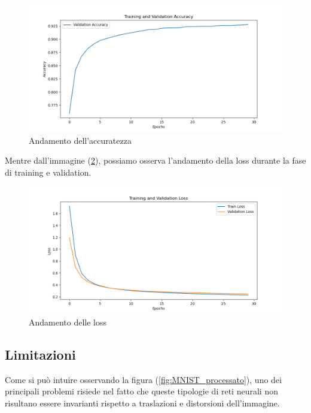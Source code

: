 \begin{figure}[H]
    \centering
    \includegraphics[width=1.0\textwidth]{Immagini/Grafici/training_validation_accuracy_v1.png}
    \caption{Andamento dell'accuratezza}
    \label{fig:DNN_accuracy_dopo}
\end{figure}

Mentre dall'immagine (\ref{fig:DNN_loss}), possiamo osserva l'andamento della loss 
durante la fase di training e validation. 

\begin{figure}[H]
    \centering
    \includegraphics[width=1.0\textwidth]{Immagini/Grafici/training_validation_loss_v1.png}
    \caption{Andamento delle loss}
    \label{fig:DNN_loss}
\end{figure}

\newpage
\subsection{Limitazioni}

Come si può intuire osservando la figura (\ref{fig:MNIST_processato}), uno dei principali
problemi risiede nel fatto che queste tipologie di reti neurali non risultano essere
invarianti rispetto a traslazioni e distorsioni dell’immagine.

